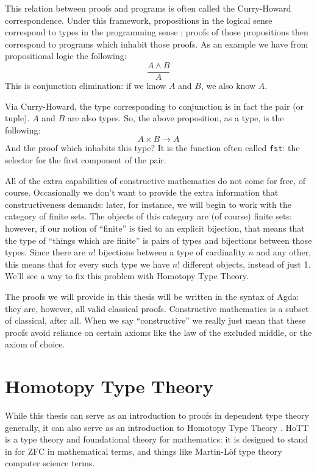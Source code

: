 This relation between proofs and programs is often called the Curry-Howard
correspondence.
Under this framework, propositions in the logical sense correspond to types in
the programming sense \citep{wadlerPropositionsTypes2015}; proofs of those
propositions then correspond to programs which inhabit those proofs.
As an example we have from propositional logic the following:
\begin{equation*}
  \frac{A \wedge B}{A}
\end{equation*}
This is conjunction elimination: if we know \(A\) and \(B\), we also know \(A\).

Via Curry-Howard, the type corresponding to conjunction is in fact the pair (or
tuple).
\(A\) and \(B\) are also types.
So, the above proposition, as a type, is the following:
\begin{equation*}
  A \times B \rightarrow A
\end{equation*}
And the proof which inhabits this type?
It is the function often called \verb+fst+: the selector for the first component
of the pair.


All of the extra capabilities of constructive mathematics do not come for free,
of course.
Occasionally we don't want to provide the extra information that
constructiveness demands: later, for instance, we will begin to work with the
category of finite sets.
The objects of this category are (of course) finite sets: however, if our notion
of ``finite'' is tied to an explicit bijection, that means that the type of
``things which are finite'' is pairs of types and bijections between those
types. 
Since there are \(n!\) bijections between a type of cardinality \(n\) and any
other, this means that for every such type we have \(n!\) different objects,
instead of just 1.
We'll see a way to fix this problem with Homotopy Type Theory.

The proofs we will provide in this thesis will be written in the syntax of
Agda: they are, however, all valid classical proofs.
Constructive mathematics is a subset of classical, after all.
When we say ``constructive'' we really just mean that these proofs avoid
reliance on certain axioms like the law of the excluded middle, or the axiom of
choice.
\section{Homotopy Type Theory}
While this thesis can serve as an introduction to proofs in dependent type
theory generally, it can also serve as an introduction to Homotopy Type Theory
\citep{hottbook}.
HoTT is a type theory and foundational theory for mathematics: it is designed to
stand in for ZFC in mathematical terms, and things like Martin-Löf type theory
computer science terms.

